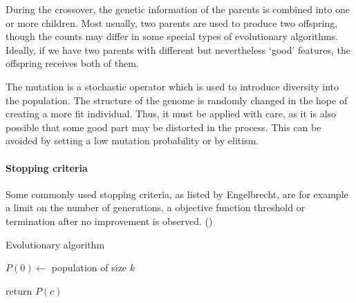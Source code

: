 During the crossover, the genetic information of the parents is combined into
one or more children. Most usually, two parents are used to produce two
offspring, though the counts may differ in some special types of evolutionary
algorithms. Ideally, if we have two parents with different but nevertheless
`good' features, the offspring receives both of them.
\citep{Eiben:2015:IEC:2810085}

The mutation is a stochastic operator which is used to introduce diversity into
the population. The structure of the genome is randomly changed in the hope
of creating a more fit individual. Thus, it must be applied with care, as it is
also possible that some good part may be distorted in the process. This can be
avoided by setting a low mutation probability or by elitism.

\paragraph{Stopping criteria}
Some commonly used stopping criteria, as listed by Engelbrecht, are for example 
a limit on the number of generations, a objective function threshold or
termination after no improvement is observed.
(\citep{Engelbrecht:2007:CII:1557464})


\begin{algorithm} \label{alg:EA}
\DontPrintSemicolon
\caption{Evolutionary algorithm}
  \;
  $P(0) \longleftarrow$ population of size $k$

  \;
  return $P(c)$  
\end{algorithm}

